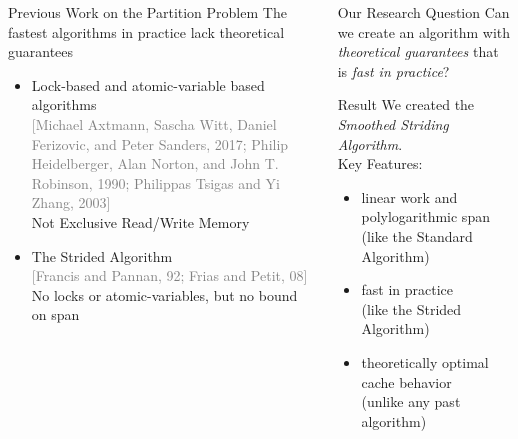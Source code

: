 \documentclass[table,serif,mathserif,final]{beamer}
\newcommand{\citefont}[1]{{\huge \textcolor{gray}{#1}}}
\theoremstyle{remark}
\begin{document}
\begin{frame}{}
\begin{columns}[t]
\begin{column}{0.5\linewidth}
\begin{block}{\Huge Previous Work on the Partition Problem}
  The {\color{darkgreen}fastest algorithms in practice} {\color{red}lack theoretical guarantees}
	\begin{itemize}
		\item Lock-based and atomic-variable based algorithms\\ \citefont{[Michael Axtmann, Sascha Witt, Daniel Ferizovic, and Peter Sanders, 2017; Philip Heidelberger, Alan Norton, and John T. Robinson, 1990; Philippas Tsigas and Yi Zhang, 2003]}\\
      {\color{red} Not Exclusive Read/Write Memory}
		\item The Strided Algorithm\\ \citefont{[Francis and Pannan, 92; Frias and Petit, 08]}\\ 
      {\color{darkgreen}No locks or atomic-variables,} {\color{red}but no bound on span}
	\end{itemize}
	\vspace{0.2cm}

\end{block}
  \end{column}

  \begin{column}{0.5\linewidth}
\begin{block}{\Huge Our Research Question}
  \justifying
  \Huge Can we create an algorithm with \emph{theoretical guarantees} that is \emph{fast in practice}?
\end{block}

\begin{block}{\Huge Result}
  \justifying
  \Huge We created the \emph{Smoothed Striding Algorithm}. \\
  Key Features:
	\begin{itemize}
		\item linear work and polylogarithmic span \\
			{\color{blue} (like the Standard Algorithm)\\}
		\vspace{0.15cm}
		\item fast in practice \\
			{\color{blue} (like the Strided Algorithm)\\}
	\vspace{0.15cm}
		\item theoretically optimal cache behavior \\
			{\color{blue} (unlike any past algorithm)}
	\end{itemize}
\end{block}


\end{column}
\end{columns}
\end{frame}
\end{document}
